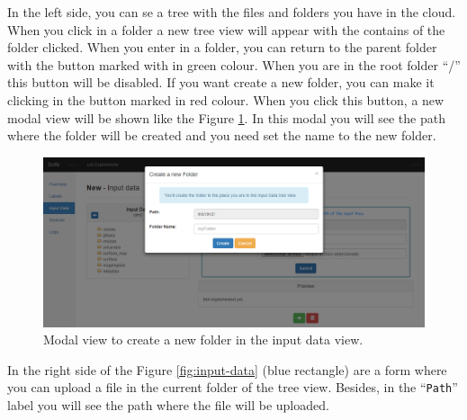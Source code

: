 \documentclass[11pt]{article}
\begin{document}
In the left side, you can se a tree with the files and folders you have in the cloud. When you click in a folder a new tree view will appear with the contains of the folder clicked. When you enter in a folder, you can return to the parent folder with the button marked with in green colour. When you are in the root folder ``/'' this button will be disabled. If you want create a new folder, you can make it clicking in the button marked in red colour. When you click this button, a new modal view will be shown like the Figure \ref{fig:input-create-folder}. In this modal you will see the path where the folder will be created and you need set the name to the new folder.
\begin{figure}[htp]
	\centering
	\includegraphics[width=\linewidth]{img/input-create-folder}
	\caption{Modal view to create a new folder in the input data view.}
	\label{fig:input-create-folder}
\end{figure}

In the right side of the Figure \ref{fig:input-data} (blue rectangle) are a form where you can upload a file in the current folder of the tree view. Besides, in the ``\texttt{Path}'' label you will see the path where the file will be uploaded.
\end{document}
